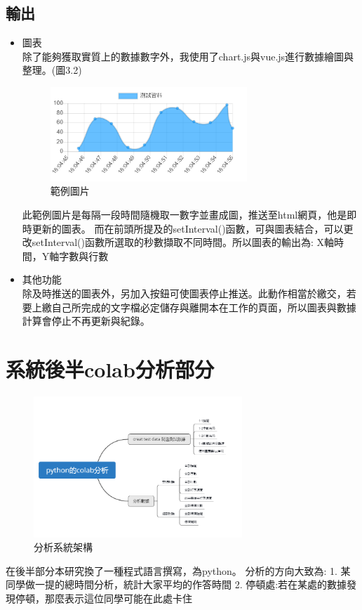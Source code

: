\subsection{輸出}
\begin{itemize}
	\item 圖表\\
	除了能夠獲取實質上的數據數字外，我使用了chart.js與vue.js進行數據繪圖與整理。\cite{name21}(圖3.2)
	\begin{figure}[H] %
		\centering %
		\includegraphics[width=0.7\textwidth]{3.png} %
		\caption{範例圖片} %
		\label{Fig.3.2} %
	\end{figure}
此範例圖片是每隔一段時間隨機取一數字並畫成圖，推送至html網頁，他是即時更新的圖表。
而在前頭所提及的setInterval()函數，可與圖表結合，可以更改setInterval()函數所選取的秒數擷取不同時間。所以圖表的輸出為: X軸時間，Y軸字數與行數
	\item 其他功能\\
	除及時推送的圖表外，另加入按鈕可使圖表停止推送。此動作相當於繳交，若要上繳自己所完成的文字檔必定儲存與離開本在工作的頁面，所以圖表與數據計算會停止不再更新與紀錄。
\end{itemize}
\section{系統後半colab分析部分}
	\begin{figure}[H] %
	\centering %
	\includegraphics[width=0.7\textwidth]{2.png} %
	\caption{分析系統架構} %
	\label{Fig.3.3} %
	\end{figure}
在後半部分本研究換了一種程式語言撰寫，為python。
分析的方向大致為:
1. 某同學做一提的總時間分析，統計大家平均的作答時間
2. 停頓處:若在某處的數據發現停頓，那麼表示這位同學可能在此處卡住
